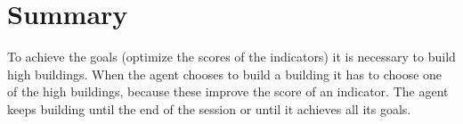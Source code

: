 \documentclass{article}
\begin{document}
\section{Summary}
To achieve the goals (optimize the scores of the indicators) it is necessary to build high  buildings. When the agent chooses to build a building it has to choose one of the high buildings, because these improve the score of an indicator. The agent keeps building until the end of the session or until it achieves all its goals. 
\end{document}
